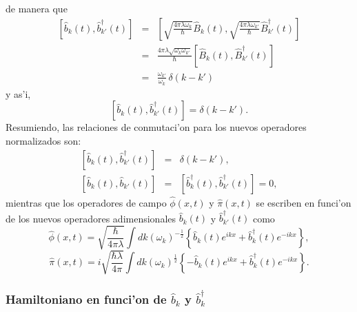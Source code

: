 de manera que
\begin{eqnarray}
\left[ \hat{b}_k(t) ,\hat{b}_{k'}^\dagger (t) \right] &=&
\left[ \sqrt{\frac{4\pi\lambda\omega_k}{\hbar}}\hat{B}_k(t)
,\sqrt{\frac{4\pi\lambda\omega_{k'}}{\hbar}}\hat{B}_{k'}^\dagger (t) \right] \\
&=& \frac{4\pi\lambda\sqrt{\omega_k\omega_{k'}}}{\hbar}\left[ \hat{B}_k(t)
,\hat{B}_{k'}^\dagger (t) \right]\\
&=&\frac{\omega_{k'}}{\omega_k}\,\delta(k-k')
\end{eqnarray}
y as'i,
\begin{equation}
\left[ \hat{b}_k(t) ,\hat{b}_{k'}^\dagger (t) \right]  = \delta(k-k') .
\end{equation}
Resumiendo, las relaciones de conmutaci'on para los nuevos operadores
normalizados son:
\begin{eqnarray}
\left[ \hat{b}_k(t) ,\hat{b}_{k'}^\dagger (t) \right] & = &\delta(k-k') ,\\
\left[ \hat{b}_k(t) ,\hat{b}_{k'}(t) \right] & = &\left[
\hat{b}_k^\dagger (t) ,\hat{b}_{k'}^\dagger (t) \right] =0
,\label{ConmutadoresDebk}
\end{eqnarray}
mientras que los operadores de campo $\hat{\phi}(x,t) $ y $\hat{\pi}(x,t) $ se
escriben en funci'on de los nuevos operadores adimensionales $\hat{b}_k(t) $ y
$\hat{b}_{k'}^\dagger (t) $ como
\begin{equation}
\hat{\phi}(x,t) =\sqrt{\frac{\hbar}{4\pi\lambda}}\int dk\left( \omega_k\right)
^{-\frac
{1}{2}}\left\{ \hat{b}_k(t) e^{ikx}+\hat{b}_k^{\dagger
}(t) e^{-ikx}\right\},\label{qOperador3}
\end{equation}
\begin{equation}
\hat{\pi}(x,t) =i\sqrt{\frac{\hbar\lambda}{4\pi}}\int dk\left( \omega_k\right)
^{\frac
{1}{2}}\left\{ -\hat{b}_k(t) e^{ikx}+\hat{b}_k^{\dagger
}(t) e^{-ikx}\right\} .\label{piOperador3}
\end{equation}

\subsubsection{Hamiltoniano en funci'on de $\hat{b}_k$ y $\hat{b}_k^\dagger
$}

